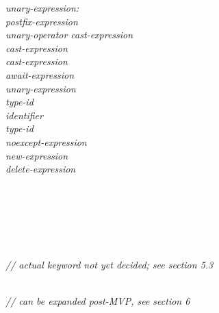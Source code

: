 \begin{adjustwidth}{0.5cm}{0.5cm}
\emph{unary-expression:} \\
\phantom{~~~}\emph{postfix-expression} \\
\phantom{~~~}\emph{unary-operator cast-expression} \\
\phantom{~~~}\tcode{++} \emph{cast-expression} \\
\phantom{~~~}\tcode{--} \emph{cast-expression} \\
\phantom{~~~}\emph{await-expression} \\
\phantom{~~~} \emph{unary-expression} \\
\phantom{~~~} \emph{type-id} \tcode{)} \\
\phantom{~~~} \emph{identifier} \tcode{)} \\
\phantom{~~~} \emph{type-id} \tcode{)} \\
\phantom{~~~}\emph{noexcept-expression} \\
\phantom{~~~}\emph{new-expression} \\
\phantom{~~~}\emph{delete-expression} \\
\phantom{~~~}

 \\
\phantom{~~~} \\
\phantom{~~~}

 \\
\phantom{~~~}

 \\
\phantom{~~~}  \phantom{~~~}\emph{// actual keyword not yet decided; see section 5.3}

 \\
\phantom{~~~} \phantom{~~~}\emph{// can be expanded post-MVP, see section 6}

 \\
\phantom{~~~}

 \\
\phantom{~~~}

\end{adjustwidth}

